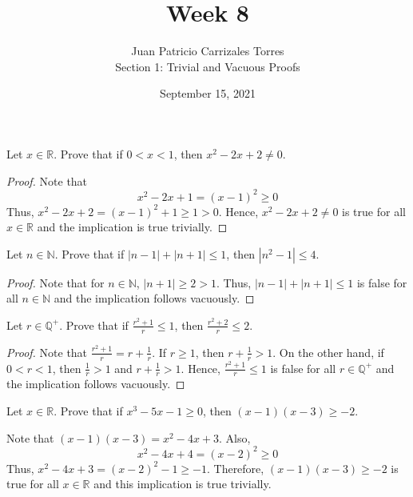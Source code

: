 \documentclass[12pt]{article}
\newcommand{\N}{\mathbb{N}}
\newcommand{\R}{\mathbb{R}}
\newcommand{\Q}{\mathbb{Q}}
\newenvironment{problem}[2][Problem]{\begin{trivlist}
		\item[\hskip \labelsep {\bfseries #1}\hskip \labelsep {\bfseries #2.}]}{\end{trivlist}}
\newenvironment{solution}[2][Solution]{\begin{trivlist}
		\item[\hskip \labelsep {\bfseries #1}\hskip \labelsep {\bfseries #2.}]}{\end{trivlist}}
\begin{document}
	
	\title{Week 8}
	\author{Juan Patricio Carrizales Torres \\
		Section 1: Trivial and Vacuous Proofs}
	\date{September 15, 2021}
	\maketitle
	
	\begin{problem}{1}
		Let $x\in \R$. Prove that if $0<x<1$, then $x^{2}-2x+2\neq 0$.
		\begin{proof}
			Note that
			\begin{equation*}
				x^{2}-2x+1=(x-1)^{2}\geq 0
			\end{equation*}
			Thus, $x^{2}-2x+2 = (x-1)^{2}+1\geq 1 >0$. Hence, $x^{2}-2x+2\neq 0$ is true for all $x\in \R$ and the implication is true trivially.  
		\end{proof}
	\end{problem}
 	
 	\begin{problem}{2}
 		Let $n\in \N$. Prove that if $|n-1|+|n+1|\leq 1$, then $|n^{2}-1|\leq 4$.
 		\begin{proof}
 			 Note that for $n \in \N$, $|n+1|\geq 2 > 1$. Thus, $|n-1|+|n+1|\leq 1$ is false for all $n\in \N$ and the implication follows vacuously.
 		\end{proof}
 	\end{problem}
 	
 	\begin{problem}{3}
 		Let $r\in \Q^{+}$. Prove that if $\frac{r^{2}+1}{r}\leq 1$, then $\frac{r^{2}+2}{r}\leq 2$.
 		\begin{proof}
 			Note that $\frac{r^{2}+1}{r} = r+\frac{1}{r}$. If $r \geq 1$, then $r+\frac{1}{r}>1$. On the other hand, if $0<r<1$, then $\frac{1}{r}>1$ and $r+\frac{1}{r}>1$. Hence, $\frac{r^{2}+1}{r}\leq 1$ is false for all $r\in \Q^{+}$ and the implication follows vacuously. 
 		\end{proof}	
 	\end{problem}
  
 	\begin{problem}{4}
 		Let $x \in \R$. Prove that if $x^{3}-5x-1 \geq 0$, then $(x-1)(x-3)\geq -2$.
 		\begin{solution}{}
 			Note that $(x-1)(x-3)=x^{2}-4x+3$. Also, 
 			\begin{equation*}
 				x^{2}-4x+4 = (x-2)^{2}\geq 0
 			\end{equation*}
 		Thus, $x^{2}-4x+3 = (x-2)^{2}-1\geq -1$. Therefore, $(x-1)(x-3)\geq -2$ is true for all $x \in \R$ and this implication is true trivially.
 		\end{solution}
 	\end{problem}
 
\end{document}
